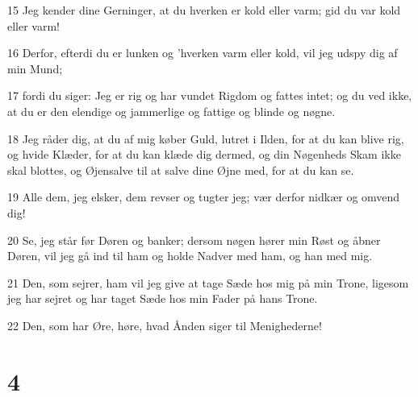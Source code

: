 \par 15 Jeg kender dine Gerninger, at du hverken er kold eller varm; gid du var kold eller varm!
\par 16 Derfor, efterdi du er lunken og 'hverken varm eller kold, vil jeg udspy dig af min Mund;
\par 17 fordi du siger: Jeg er rig og har vundet Rigdom og fattes intet; og du ved ikke, at du er den elendige og jammerlige og fattige og blinde og nøgne.
\par 18 Jeg råder dig, at du af mig køber Guld, lutret i Ilden, for at du kan blive rig, og hvide Klæder, for at du kan klæde dig dermed, og din Nøgenheds Skam ikke skal blottes, og Øjensalve til at salve dine Øjne med, for at du kan se.
\par 19 Alle dem, jeg elsker, dem revser og tugter jeg; vær derfor nidkær og omvend dig!
\par 20 Se, jeg står før Døren og banker; dersom nøgen hører min Røst og åbner Døren, vil jeg gå ind til ham og holde Nadver med ham, og han med mig.
\par 21 Den, som sejrer, ham vil jeg give at tage Sæde hos mig på min Trone, ligesom jeg har sejret og har taget Sæde hos min Fader på hans Trone.
\par 22 Den, som har Øre, høre, hvad Ånden siger til Menighederne!

\chapter{4}


